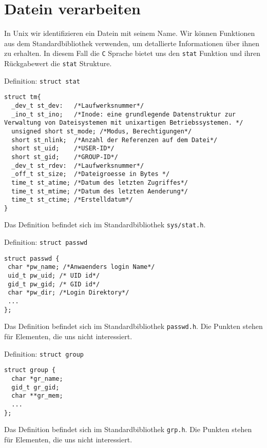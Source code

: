 \section{Datein verarbeiten}
In Unix wir identifizieren ein Datein mit seinem Name. Wir können Funktionen aus dem Standardbibliothek verwenden, um
detallierte Informationen über ihnen zu erhalten. In diesem Fall die \texttt{C} Sprache bietet uns den \texttt{stat} Funktion 
und ihren Rückgabewert die \texttt{stat} Strukture. 
\begin{myexampleblock}{Definition: \texttt{struct stat}}
\begin{lstlisting}
struct tm{
  _dev_t st_dev:   /*Laufwerksnummer*/
  _ino_t st_ino;   /*Inode: eine grundlegende Datenstruktur zur Verwaltung von Dateisystemen mit unixartigen Betriebssystemen. */
  unsigned short st_mode; /*Modus, Berechtigungen*/
  short st_nlink;  /*Anzahl der Referenzen auf dem Datei*/
  short st_uid;    /*USER-ID*/
  short st_gid;    /*GROUP-ID*/
  _dev_t st_rdev:  /*Laufwerksnummer*/
  _off_t st_size;  /*Dateigroesse in Bytes */
  time_t st_atime; /*Datum des letzten Zugriffes*/
  time_t st_mtime; /*Datum des letzten Aenderung*/
  time_t st_ctime; /*Erstelldatum*/
}
\end{lstlisting}
\vspace{-0.4cm}
Das Definition befindet sich im Standardbibliothek \texttt{sys/stat.h}.
\end{myexampleblock}
\begin{myexampleblock}{Definition: \texttt{struct passwd}}
\begin{lstlisting}
struct passwd {
 char *pw_name; /*Anwaenders login Name*/
 uid_t pw_uid; /* UID id*/
 gid_t pw_gid; /* GID id*/
 char *pw_dir; /*Login Direktory*/
 ...
}; 
\end{lstlisting}
\vspace{-0.4cm}
Das Definition befindet sich im Standardbibliothek \texttt{passwd.h}.
Die Punkten stehen für Elementen, die uns nicht interessiert.
\end{myexampleblock}
\begin{myexampleblock}{Definition: \texttt{struct group}}
\begin{lstlisting}
struct group {
  char *gr_name;
  gid_t gr_gid;
  char **gr_mem;
  ...
};
\end{lstlisting}
\vspace{-0.4cm}
Das Definition befindet sich im Standardbibliothek \texttt{grp.h}.
Die Punkten stehen für Elementen, die uns nicht interessiert.
\end{myexampleblock}
